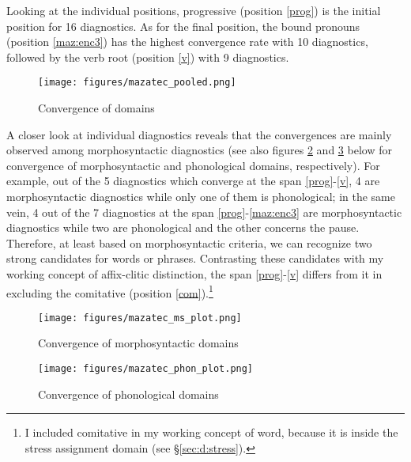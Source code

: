 \documentclass[output=paper]{langscibook}
\begin{document}
Looking at the individual positions, progressive (position \ref{prog}) is the initial position for 16 diagnostics. As for the final position, the bound pronouns (position \ref{maz:enc3}) has the highest convergence rate with 10 diagnostics, followed by the verb root (position \ref{v}) with 9 diagnostics.

\begin{figure}
    \caption{Convergence of domains}
    \label{fig:conv_pooled}
    \texttt{[image: figures/mazatec\_pooled.png]}
\end{figure}


\hspace*{-1.1pt}A closer look at individual diagnostics reveals that the convergences are mainly observed among morphosyntactic diagnostics (see also figures \ref{fig:conv_ms} and \ref{fig:conv_phon} below for convergence of morphosyntactic and phonological domains, respectively). For example, out of the 5 diagnostics which converge at the span \ref{prog}-\ref{v}, 4 are morphosyntactic diagnostics while only one of them is phonological; in the same vein, 4 out of the 7 diagnostics at the span \ref{prog}-\ref{maz:enc3} are morphosyntactic diagnostics while two are phonological and the other concerns the pause. Therefore, at least based on morphosyntactic criteria, we can recognize two strong candidates for words or phrases. Contrasting these candidates with my working concept of affix-clitic distinction, the span \ref{prog}-\ref{v} differs from it in excluding the comitative (position \ref{com}).\footnote{I included comitative in my working concept of word, because it is inside the stress assignment domain (see \S\ref{sec:d:stress}).}

\begin{figure}
    \caption{Convergence of morphosyntactic domains}
    \label{fig:conv_ms}
    \texttt{[image: figures/mazatec\_ms\_plot.png]}
\end{figure}

\begin{figure}
    \caption{Convergence of phonological domains}
    \label{fig:conv_phon}
    \texttt{[image: figures/mazatec\_phon\_plot.png]}
\end{figure}
\end{document}
